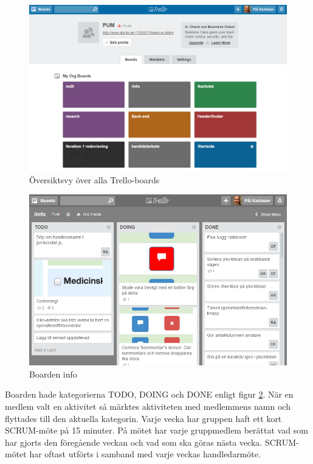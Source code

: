 \documentclass{article}
\begin{document}
\begin{figure}[htbp]
	\begin{center}
	\includegraphics[scale=0.4]{trello.png}
	\caption{Översiktsvy över alla Trello-boards}
	\label{fig:trello}
	\end{center}
\end{figure}


\begin{figure}[htbp]
	\begin{center}
	\includegraphics[scale=0.5]{trello2.png}
	\caption{Boarden info}
	\label{fig:trello2}
	\end{center}
\end{figure}


Boarden hade kategorierna TODO, DOING och DONE enligt figur \ref{fig:trello2}. När en medlem valt en aktivitet så märktes aktiviteten med medlemmens namn och flyttades till den aktuella kategorin. Varje vecka har gruppen haft ett kort SCRUM-möte på 15 minuter. På mötet har varje gruppmedlem berättat vad som har gjorts den föregående veckan och vad som ska göras nästa vecka. SCRUM-mötet har oftast utförts i samband med varje veckas handledarmöte.
\end{document}
